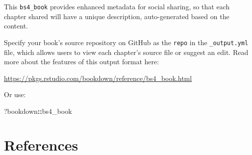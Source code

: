 \documentclass[
]{book}
\newenvironment{Shaded}{\begin{snugshade}}{\end{snugshade}}
\newcommand{\NormalTok}[1]{#1}
\newcommand{\SpecialCharTok}[1]{\textcolor[rgb]{0.81,0.36,0.00}{\textbf{#1}}}
\theoremstyle{definition}
\theoremstyle{definition}
\theoremstyle{definition}
\theoremstyle{definition}
\theoremstyle{remark}
\begin{document}
This \texttt{bs4\_book} provides enhanced metadata for social sharing, so that each chapter shared will have a unique description, auto-generated based on the content.

Specify your book's source repository on GitHub as the \texttt{repo} in the \texttt{\_output.yml} file, which allows users to view each chapter's source file or suggest an edit. Read more about the features of this output format here:

\url{https://pkgs.rstudio.com/bookdown/reference/bs4_book.html}

Or use:

\begin{Shaded}
\begin{Highlighting}[]
\NormalTok{?bookdown}\SpecialCharTok{::}\NormalTok{bs4\_book}
\end{Highlighting}
\end{Shaded}

\chapter{References}\label{references}


\end{document}
